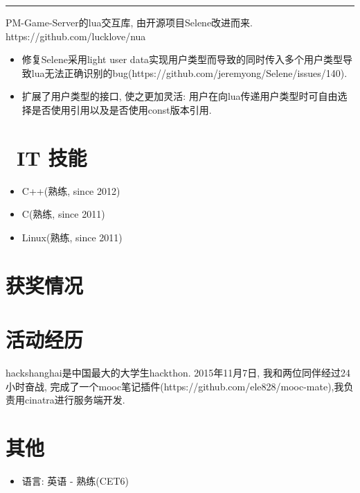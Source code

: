 \documentclass{resume}
\newcommand{\subsectionrule}{{\vspace{-8pt}\hspace{0.5cm}\rule[1pt]{\linewidth-1cm}{0.05pt}\vspace{-8pt}}}
\begin{document}
\subsectionrule

\begin{onehalfspacing}
PM-Game-Server的lua交互库, 由开源项目Selene改进而来.
\newline
https://github.com/lucklove/nua
\begin{itemize}
  \item 修复Selene采用light user data实现用户类型而导致的同时传入多个用户类型导致lua无法正确识别的bug(https://github.com/jeremyong/Selene/issues/140).
  \item 扩展了用户类型的接口, 使之更加灵活: 用户在向lua传递用户类型时可自由选择是否使用引用以及是否使用const版本引用.
\end{itemize}
\end{onehalfspacing}



\section{\faCogs\ IT 技能}
\begin{itemize}[parsep=0.5ex]
  \item C++(熟练, since 2012)
  \item C(熟练, since 2011)
  \item Linux(熟练, since 2011)
\end{itemize}

\section{\faHeartO 获奖情况}

\section{\faUsers 活动经历}
hackshanghai是中国最大的大学生hackthon. 2015年11月7日, 我和两位同伴经过24小时奋战, 完成了一个mooc笔记插件(https://github.com/ele828/mooc-mate),我负责用cinatra进行服务端开发. 

\section{\faInfo 其他}
\begin{itemize}[parsep=0.5ex]
  \item 语言: 英语 - 熟练(CET6)
\end{itemize}

%
%
\end{document}
